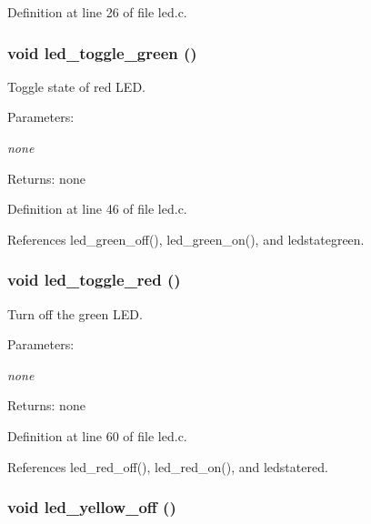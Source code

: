 Definition at line 26 of file led.c.
\subsubsection{\setlength{\rightskip}{0pt plus 5cm}void led\_\-toggle\_\-green ()}\label{led_8h_c1c7150a1df4b7fc5800cbe642a70812}


Toggle state of red LED. 

\begin{Desc}
\item[Parameters:]
\begin{description}
\item[{\em none}]\end{description}
\end{Desc}
\begin{Desc}
\item[Returns:]none \end{Desc}


Definition at line 46 of file led.c.

References led\_\-green\_\-off(), led\_\-green\_\-on(), and ledstategreen.
\subsubsection{\setlength{\rightskip}{0pt plus 5cm}void led\_\-toggle\_\-red ()}\label{led_8h_2bb924e68be183ef7b4d50f88c25e9cc}


Turn off the green LED. 

\begin{Desc}
\item[Parameters:]
\begin{description}
\item[{\em none}]\end{description}
\end{Desc}
\begin{Desc}
\item[Returns:]none \end{Desc}


Definition at line 60 of file led.c.

References led\_\-red\_\-off(), led\_\-red\_\-on(), and ledstatered.
\subsubsection{\setlength{\rightskip}{0pt plus 5cm}void led\_\-yellow\_\-off ()}\label{led_8h_5e8ab2681b60fc4b1fa8a855152ada4c}


